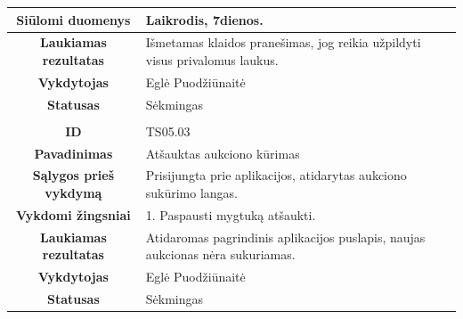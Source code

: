 \documentclass{VUMIFPSkursinis}
\begin{document}
	\begin{table}[H]
			\begin{tabular}{|p{6cm}|p{11cm}|}
			\hline
			\multicolumn{1}{|c|}{{\bfseries Siūlomi duomenys}}&
			{Laikrodis, 7dienos.}\\
			\hline
			\multicolumn{1}{|c|}{{\bfseries Laukiamas rezultatas}}&
			{Išmetamas klaidos pranešimas, jog reikia užpildyti visus privalomus laukus.}\\
			\hline
			\multicolumn{1}{|c|}{{\bfseries Vykdytojas}}&
			{Eglė Puodžiūnaitė}\\
			\hline
			\multicolumn{1}{|c|}{{\bfseries Statusas}}&
			{Sėkmingas}\\
			\hline
			\rowcolor{lightgray}
			\multicolumn{2}{|c|}{}\\
			\hline
			\multicolumn{1}{|c|}{{\bfseries ID}}&
			{TS05.03}\\
			\hline
			\multicolumn{1}{|c|}{{\bfseries Pavadinimas}}&
			{Atšauktas aukciono kūrimas}\\
			\hline
			\multicolumn{1}{|c|}{{\bfseries Sąlygos prieš vykdymą}}&
			{Prisijungta prie aplikacijos, atidarytas aukciono sukūrimo langas.}\\
			\hline
			\multicolumn{1}{|c|}{{\bfseries Vykdomi žingsniai}}&
			{1. Paspausti mygtuką atšaukti.}\\
			\hline
			\multicolumn{1}{|c|}{{\bfseries Laukiamas rezultatas}}&
			{Atidaromas pagrindinis aplikacijos puslapis, naujas aukcionas nėra sukuriamas.}\\
			\hline
			\multicolumn{1}{|c|}{{\bfseries Vykdytojas}}&
			{Eglė Puodžiūnaitė}\\
			\hline
			\multicolumn{1}{|c|}{{\bfseries Statusas}}&
			{Sėkmingas}\\
			\hline
		\end{tabular}
	\end{table}	
\end{document}
